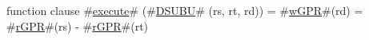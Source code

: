 function clause #\hyperref[zexecute]{execute}# (#\hyperref[zDSUBU]{DSUBU}# (rs, rt, rd)) =
  {
    #\hyperref[zwGPR]{wGPR}#(rd) = #\hyperref[zrGPR]{rGPR}#(rs) - #\hyperref[zrGPR]{rGPR}#(rt)
  }
